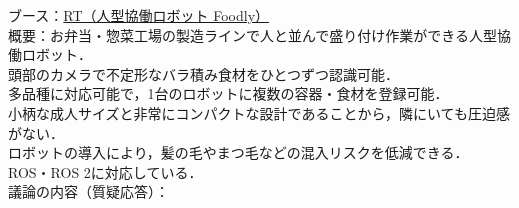 \documentclass{jsarticle}
\begin{document}
\vspace*{4mm}

\hspace*{4.7zw}ブース：\underline{RT（人型協働ロボット Foodly）}\\

\hspace*{4.7zw}概要：お弁当・惣菜工場の製造ラインで人と並んで盛り付け作業ができる人型協働ロボット．\\
\hspace*{8.7zw}頭部のカメラで不定形なバラ積み食材をひとつずつ認識可能．\\
\hspace*{8.7zw}多品種に対応可能で，1台のロボットに複数の容器・食材を登録可能．\\
\hspace*{8.7zw}小柄な成人サイズと非常にコンパクトな設計であることから，隣にいても圧迫感がない．\\
\hspace*{8.7zw}ロボットの導入により，髪の毛やまつ毛などの混入リスクを低減できる．\\
\hspace*{8.7zw}ROS・ROS 2に対応している．\\


\hspace*{4.7zw}議論の内容（質疑応答）：
\end{document}
